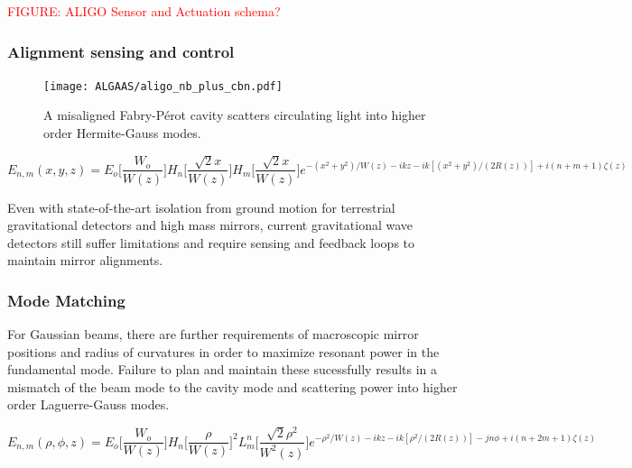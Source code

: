 \textcolor{red}{FIGURE: ALIGO Sensor and Actuation schema?}

\subsubsection{Alignment sensing and control}

\begin{figure}[H]
    \begin{center}
    \texttt{[image: ALGAAS/aligo\_nb\_plus\_cbn.pdf]}
    \end{center}
    \caption{A misaligned Fabry-P\'{e}rot cavity scatters circulating light into higher order Hermite-Gauss modes.}
\label{fig:aligo_tn_comparison}
\end{figure}

\begin{equation}
	E_{n,m}(x,y,z) = E_o \bigg[ \frac{W_o}{W(z)} \bigg] H_n \bigg[ \frac{\sqrt{2}x}{W(z)} \bigg] H_m \bigg[ \frac{\sqrt{2}x}{W(z)} \bigg] e^{-(x^2 + y^2)/W(z) - ikz - ik[(x^2 + y^2)/(2R(z))] + i(n + m + 1)\zeta(z)}
\end{equation}

Even with state-of-the-art isolation from ground motion for terrestrial gravitational detectors and high mass mirrors, current gravitational wave detectors still suffer limitations and require sensing and feedback loops to maintain mirror alignments.

\subsubsection{Mode Matching}
For Gaussian beams, there are further requirements of macroscopic mirror positions and radius of curvatures in order to  maximize resonant power in the fundamental mode. Failure to plan and maintain these sucessfully results in a mismatch of the beam mode to the cavity mode and scattering power into higher order Laguerre-Gauss modes.  

\begin{equation}
	E_{n,m}(\rho, \phi, z) =  E_o \bigg[ \frac{W_o}{W(z)} \bigg] H_n \bigg[ \frac{\rho}{W(z)} \bigg]^2 L^n_m \bigg[ \frac{\sqrt{2}\rho^2}{W^2(z)} \bigg] e^{-\rho^2/W(z) - ikz - ik[\rho^2/(2R(z))] - jn \phi + i(n + 2m + 1)\zeta(z)}
\end{equation}

